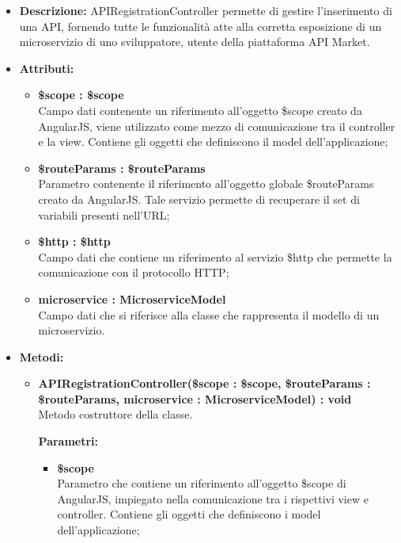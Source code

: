 \begin{itemize}
	\item \textbf{Descrizione:} APIRegistrationController permette di gestire l'inserimento di una API, fornendo tutte le funzionalità atte alla corretta esposizione di un microservizio di uno sviluppatore, utente della piattaforma API Market.
	\item \textbf{Attributi:}
		\begin{itemize}
		
			\item \textbf{\$scope : \$scope}\\
			Campo dati contenente un riferimento all'oggetto \$scope creato da AngularJS, viene utilizzato come mezzo di comunicazione tra il controller e la view. Contiene gli oggetti che definiscono il model dell'applicazione;
			
			\item \textbf{\$routeParams : \$routeParams}\\
			Parametro contenente il riferimento all'oggetto globale \$routeParams creato da AngularJS. Tale servizio permette di recuperare il set di variabili presenti nell'URL;

			\item \textbf{\$http : \$http }\\
			Campo dati che contiene un riferimento al servizio \$http che permette la comunicazione con il protocollo HTTP;
				
			\item \textbf{microservice : MicroserviceModel }\\
			Campo dati che si riferisce alla classe che rappresenta il modello di un microservizio.
				
		\end{itemize}
	\item \textbf{Metodi:}
		\begin{itemize}
		
			\item \textbf{APIRegistrationController(\$scope : \$scope, \$routeParams : \$routeParams, microservice : MicroserviceModel) : void}\\
			Metodo costruttore della classe.
			\begin{description}
    			\item[\textbf{Parametri:}]
			\end{description}
			\begin{itemize}
				\item \textbf{\$scope}\\
				Parametro che contiene un riferimento all'oggetto \$scope di AngularJS, impiegato nella comunicazione tra i rispettivi view e controller. Contiene gli oggetti che definiscono i model dell'applicazione;
				

\end{itemize}
\end{itemize}
\end{itemize}
